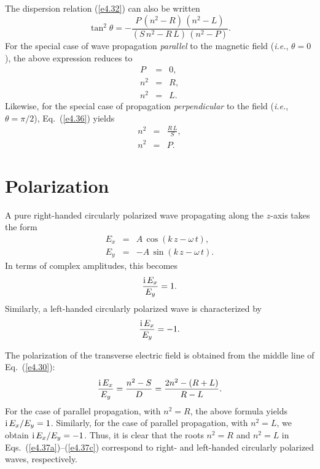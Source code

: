 The dispersion relation (\ref{e4.32}) can also be written
\begin{equation}\label{e4.36}
\tan^2\theta = -\frac{P\,(n^2-R)\,(n^2-L)}{(S\,n^2 - R\,L)\,(n^2-P)}.
\end{equation}
For the special case of wave propagation {\em parallel}\/ to the magnetic
field ({\em i.e.}, $\theta=0$), the above expression reduces to
\begin{eqnarray}
P&=& 0,\label{e4.37a}\\[0.5ex]
n^2 &=& R,\\[0.5ex]
n^2 &=& L.\label{e4.37c}
\end{eqnarray}
Likewise, for the special case of propagation {\em perpendicular}\/ to the
field ({\em i.e.}, $\theta=\pi/2$), Eq.~(\ref{e4.36}) yields
\begin{eqnarray}
n^2 &=& \frac{R\,L}{S},\\[0.5ex]
n^2 &=& P.
\end{eqnarray}

\section{Polarization}
A pure right-handed circularly polarized wave propagating along the
$z$-axis takes the form
\begin{eqnarray}
E_x &=& A\,\cos(k\,z-\omega \,t),\\[0.5ex]
E_y &=& -A\,\sin (k\,z-\omega \,t).
\end{eqnarray}
In terms of complex amplitudes, this becomes
\begin{equation}
\frac{{\rm i}\,E_x}{E_y} = 1.
\end{equation}
Similarly, a left-handed circularly polarized wave is characterized by
\begin{equation}
\frac{{\rm i}\,E_x}{E_y} = -1.
\end{equation}

The polarization of the transverse electric field is obtained from the
middle line of Eq.~(\ref{e4.30}):
\begin{equation}
\frac{{\rm i}\,E_x}{E_y} = \frac{n^2 -S}{D} = \frac{2n^2 - (R+L)}{R-L}.
\end{equation}
For the case of parallel propagation, with $n^2 = R$, the above formula
yields ${\rm i}\,E_x/E_y = 1$. Similarly, for the case of parallel propagation,
with $n^2 = L$, we obtain ${\rm i}\,E_x/E_y = -1$. Thus, it is clear that
the roots $n^2=R$ and $n^2=L$ in Eqs.~(\ref{e4.37a})--(\ref{e4.37c}) correspond to
right- and left-handed circularly polarized waves, respectively. 

